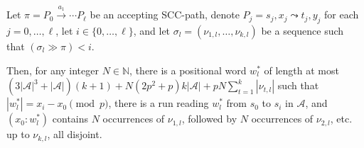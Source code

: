\documentclass[letterpaper, USenglish, cleveref, autoref, thm-restate, numberwithinsect]{lipics-v2021}
\theoremstyle{theorem}
\theoremstyle{definition}
\newcommand{\Aa}{\mathcal{A}}
\newcommand{\curly}{\mathrel{\leadsto}}
\newcommand{\lefteffect}[2]{(#1 \gg #2)}
\newcommand{\NN}{\mathbb{N}}
\newcommand{\portal}[4]{#1,#2 \curly #3, #4}
\newcommand{\SCCpath}{\pi}
\newcommand{\set}[1]{\{ #1 \}}
\newcommand{\timedword}[2]{(#1:#2)}
\begin{document}
\begin{lemma}
	\label{lem:seq-left}
	Let $\SCCpath = P_0 \xrightarrow{a_1} \cdots  P_\ell$ be an accepting SCC-path,
	denote $P_j = \portal{s_j}{x_j}{t_j}{y_j}$ for each $j = 0,\ldots,\ell$,
	let $i \in \set{0, \ldots, \ell}$,
	and let $\sigma_l = (\nu_{1,l}, \ldots, \nu_{k,l})$ be a sequence such that $\lefteffect{\sigma_l}{\SCCpath} < i$.

	Then, for any integer $N \in \NN$, there is a positional word $w_l^*$ of length at most $(3|\Aa|^3+|\Aa|)(k+1)  + N(2p^2+p)k|\Aa| + pN\sum_{t=1}^k|\nu_{t,l}|$ such that $|w_l^*| = x_i-x_0 \pmod{p}$, there is a run reading $w_l^*$ from $s_0$ to $s_i$ in $\Aa$, and $\timedword{x_0}{w_l^*}$ contains $N$ occurrences of $\nu_{1,l}$, followed by $N$ occurrences of $\nu_{2,l}$, etc. up to $\nu_{k,l}$, all disjoint.
\end{lemma}
\end{document}
